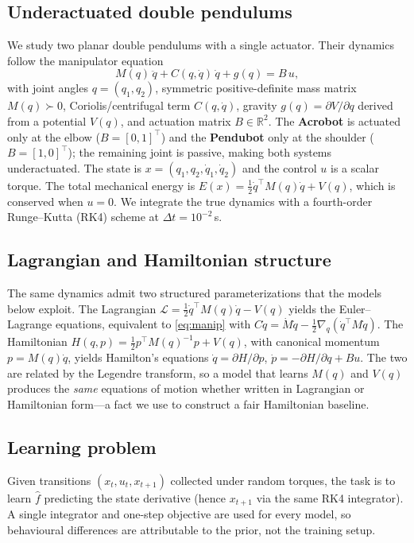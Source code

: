 \documentclass[conference]{IEEEtran}
\begin{document}
\subsection{Underactuated double pendulums}
We study two planar double pendulums with a single actuator. Their dynamics follow
the manipulator equation
\begin{equation}
\label{eq:manip}
M(q)\,\ddot q + C(q,\dot q)\,\dot q + g(q) = B\,u,
\end{equation}
with joint angles $q=(q_1,q_2)$, symmetric positive-definite mass matrix
$M(q)\succ 0$, Coriolis/centrifugal term $C(q,\dot q)$, gravity
$g(q)=\partial V/\partial q$ derived from a potential $V(q)$, and actuation matrix
$B\in\mathbb{R}^2$. The \textbf{Acrobot} is actuated only at the elbow
($B=[0,1]^\top$) and the \textbf{Pendubot} only at the shoulder ($B=[1,0]^\top$);
the remaining joint is passive, making both systems underactuated. The state is
$x=(q_1,q_2,\dot q_1,\dot q_2)$ and the control $u$ is a scalar torque. The total
mechanical energy is $E(x)=\tfrac12\dot q^\top M(q)\dot q + V(q)$, which is
conserved when $u=0$. We integrate the true dynamics with a fourth-order
Runge--Kutta (RK4) scheme at $\Delta t=10^{-2}\,$s.

\subsection{Lagrangian and Hamiltonian structure}
The same dynamics admit two structured parameterizations that the models below
exploit. The Lagrangian $\mathcal{L}=\tfrac12\dot q^\top M(q)\dot q - V(q)$ yields
the Euler--Lagrange equations, equivalent to \eqref{eq:manip} with
$C\dot q = \dot M\dot q - \tfrac12\nabla_q(\dot q^\top M\dot q)$. The Hamiltonian
$H(q,p)=\tfrac12 p^\top M(q)^{-1}p + V(q)$, with canonical momentum $p=M(q)\dot q$,
yields Hamilton's equations $\dot q=\partial H/\partial p$,
$\dot p=-\partial H/\partial q + Bu$. The two are related by the Legendre
transform, so a model that learns $M(q)$ and $V(q)$ produces the \emph{same}
equations of motion whether written in Lagrangian or Hamiltonian form---a fact we
use to construct a fair Hamiltonian baseline.

\subsection{Learning problem}
Given transitions $(x_t,u_t,x_{t+1})$ collected under random torques, the task is
to learn $\hat f$ predicting the state derivative (hence $x_{t+1}$ via the same
RK4 integrator). A single integrator and one-step objective are used for every
model, so behavioural differences are attributable to the prior, not the training
setup.
\end{document}
